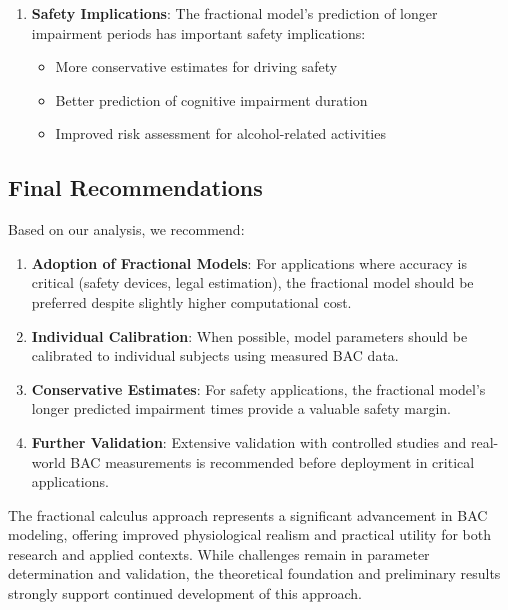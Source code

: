 \documentclass[11pt]{article}
\begin{document}
\begin{enumerate}
    \item \textbf{Safety Implications}: The fractional model's prediction of longer impairment periods has important safety implications:
    \begin{itemize}
        \item More conservative estimates for driving safety
        \item Better prediction of cognitive impairment duration
        \item Improved risk assessment for alcohol-related activities
    \end{itemize}
\end{enumerate}

\subsection{Final Recommendations}

Based on our analysis, we recommend:

\begin{enumerate}
    \item \textbf{Adoption of Fractional Models}: For applications where accuracy is critical (safety devices, legal estimation), the fractional model should be preferred despite slightly higher computational cost.
    
    \item \textbf{Individual Calibration}: When possible, model parameters should be calibrated to individual subjects using measured BAC data.
    
    \item \textbf{Conservative Estimates}: For safety applications, the fractional model's longer predicted impairment times provide a valuable safety margin.
    
    \item \textbf{Further Validation}: Extensive validation with controlled studies and real-world BAC measurements is recommended before deployment in critical applications.
\end{enumerate}

The fractional calculus approach represents a significant advancement in BAC modeling, offering improved physiological realism and practical utility for both research and applied contexts. While challenges remain in parameter determination and validation, the theoretical foundation and preliminary results strongly support continued development of this approach.


\end{document}
